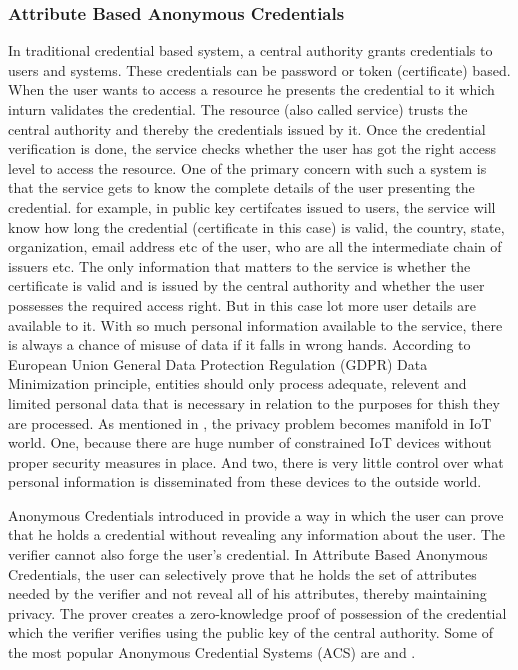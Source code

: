 \documentclass[journal]{IEEEtran}
\begin{document}
\subsubsection{Attribute Based Anonymous Credentials}
In traditional credential based system, a central authority grants credentials to users and systems. These credentials can be password or token (certificate) based. When the user wants to access a resource he presents the credential to it which inturn validates the credential. The resource (also called service) trusts the central authority and thereby the credentials issued by it. Once the credential verification is done, the service checks whether the user has got the right access level to access the resource. One of the primary concern with such a system is that the service gets to know the complete details of the user presenting the credential. for example, in public key certifcates issued to users, the service will know how long the credential (certificate in this case) is valid, the country, state, organization, email address etc of the user, who are all the intermediate chain of issuers etc. The only information that matters to the service is whether the certificate is valid and is issued by the central authority and whether the user possesses the required access right. But in this case lot more user details are available to it. With so much personal information available to the service, there is always a chance of misuse of data if it falls in wrong hands. According to European Union General Data Protection Regulation (GDPR) Data Minimization principle, entities should only process adequate, relevent and limited personal data that is necessary in relation to the purposes for thish they are processed. As mentioned in \cite{Ziegeldorf2014PrivacyIT}, the privacy problem becomes manifold in IoT world. One, because there are huge number of constrained IoT devices without proper security measures in place. And two, there is very little control over what personal information is disseminated from these devices to the outside world.

Anonymous Credentials introduced in \cite{chaum83blindsign} provide a way in which the user can prove that he holds a credential without revealing any information about the user. The verifier cannot also forge the user's credential. In Attribute  Based Anonymous Credentials, the user can selectively prove that he holds the set of attributes needed by the verifier and not reveal all of his attributes, thereby maintaining privacy. The prover creates a zero-knowledge proof of possession of the credential which the verifier verifies using the public key of the central authority. Some of the most popular Anonymous Credential Systems (ACS) are \cite{CamenischH02} and \citep{uprove}.
\end{document}
